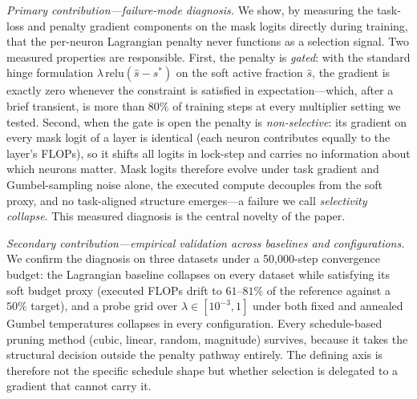 \documentclass[fleqn,10pt]{article}
\begin{document}
\textit{Primary contribution---failure-mode diagnosis.} We show, by
measuring the task-loss and penalty gradient components on the mask
logits directly during training, that the per-neuron Lagrangian
penalty never functions as a selection signal. Two measured
properties are responsible. First, the penalty is \emph{gated}: with
the standard hinge formulation
$\lambda\,\mathrm{relu}(\hat{s}-s^{*})$ on the soft active fraction
$\hat{s}$, the gradient is exactly zero whenever the constraint is
satisfied in expectation---which, after a brief transient, is more
than $80\%$ of training steps at every multiplier setting we tested.
Second, when the gate is open the penalty is \emph{non-selective}:
its gradient on every mask logit of a layer is identical (each
neuron contributes equally to the layer's FLOPs), so it shifts all
logits in lock-step and carries no information about which neurons
matter. Mask logits therefore evolve under task gradient and
Gumbel-sampling noise alone, the executed compute decouples from the
soft proxy, and no task-aligned structure emerges---a failure we
call \emph{selectivity collapse}. This measured diagnosis is the
central novelty of the paper.

\textit{Secondary contribution---empirical validation across
baselines and configurations.} We confirm the diagnosis on three
datasets under a 50{,}000-step convergence budget: the Lagrangian
baseline collapses on every dataset while satisfying its soft budget
proxy (executed FLOPs drift to $61$--$81\%$ of the reference against
a $50\%$ target), and a probe grid over $\lambda \in [10^{-3},1]$
under both fixed and annealed Gumbel temperatures collapses in
every configuration. Every schedule-based pruning method (cubic,
linear, random, magnitude) survives, because it takes the
structural decision outside the penalty pathway entirely. The
defining axis is therefore not the specific schedule shape but
whether selection is delegated to a gradient that cannot carry it.
\end{document}
